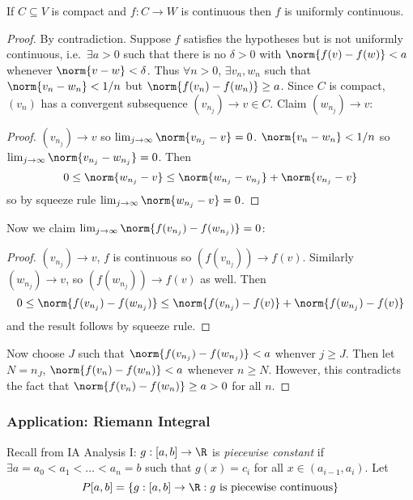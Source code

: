 \documentclass[a4paper]{article}
\theoremstyle{definition}
\begin{document}
\begin{theorem}
  If \(C \subseteq V\) is compact and \(f: C \to W\) is continuous then \(f\) is uniformly continuous.
\end{theorem}

\begin{proof}
  By contradiction. Suppose \(f\) satisfies the hypotheses but is not uniformly continuous, i.e.\ \(\exists a > 0\) such that there is no \(\delta > 0\) with \(\norm{f(v) - f (w)} < a\) whenever \(\norm{v - w} < \delta\). Thus \(\forall n > 0\), \(\exists v_n, w_n\) such that \(\norm{v_n - w_n} < 1/n\) but \(\norm{f(v_n) - f(w_n)} \geq a\). Since \(C\) is compact, \((v_n)\) has a convergent subsequence \((v_{n_j}) \to v \in C\). Claim \((w_{n_j}) \to v\):
  \begin{proof}
    \((v_{n_j}) \to  v\) so \(\lim_{j\to \infty}\norm{v_{n_j} - v} = 0\). \(\norm{v_n - w_n} < 1/n\) so \(\lim_{j\to \infty}\norm{v_{n_j} - w_{n_j}} = 0\). Then
    \[
      0 \leq \norm{w_{n_j} - v} \leq \norm{w_{n_j} - v_{n_j}} + \norm{v_{n_j} - v}
  \]
  so by squeeze rule \(\lim_{j\to \infty} \norm{w_{n_j} - v} = 0\).
  \end{proof}
  Now we claim \(\lim_{j\to \infty} \norm{f(v_{n_j}) - f(w_{n_j})} = 0\):
    \begin{proof}
      \((v_{n_j}) \to v\), \(f\) is continuous so \((f(v_{n_j})) \to f(v)\).
      Similarly \((w_{n_j}) \to v\), so \((f(w_{n_j})) \to f(v)\) as well. Then
      \[
        0 \leq \norm{f(v_{n_j}) - f(w_{n_j})} \leq \norm{f(v_{n_j}) - f(v)} + \norm{f(w_{n_j}) - f(v)}
      \]
      and the result follows by squeeze rule.
    \end{proof}
    Now choose \(J\) such that \(\norm{f(v_{n_j}) - f(w_{n_j})} < a\) whenver \(j \geq J\). Then let \(N = n_J\), \(\norm{f(v_n) - f(w_n)} < a\) whenever \(n \geq N\). However, this contradicts the fact that \(\norm{f(v_n) - f(w_n)} \geq a > 0\) for all \(n\).
\end{proof}

\subsubsection{Application: Riemann Integral}

Recall from IA Analysis I: \(g: [a, b] \to \R \) is \emph{piecewise constant} if \(\exists a = a_0 < a_1 < \dots < a_n = b\) such that \(g(x) = c_i\) for all \(x\in (a_{i-1}, a_i)\). Let
\[
  P[a, b] = \{g: [a, b] \to \R: g \text{ is piecewise continuous} \}
\]
\end{document}
